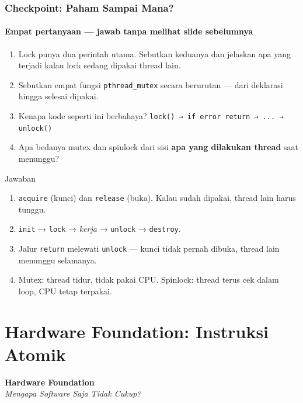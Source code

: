 \documentclass[t,aspectratio=169,xcolor=dvipsnames]{beamer}
\begin{document}
\begin{frame}
    \frametitle{Checkpoint: Paham Sampai Mana?}
    \framesubtitle{Empat pertanyaan — jawab tanpa melihat slide sebelumnya}
    \small

    \begin{enumerate}
        \item Lock punya dua perintah utama. Sebutkan keduanya dan jelaskan apa yang terjadi kalau lock sedang dipakai thread lain.
        \item Sebutkan empat fungsi \texttt{pthread\_mutex} secara berurutan — dari deklarasi hingga selesai dipakai.
        \item Kenapa kode seperti ini berbahaya?
        \texttt{lock() → if error return → ... → unlock()}
        \item Apa bedanya mutex dan spinlock dari sisi \textbf{apa yang dilakukan thread} saat menunggu?
    \end{enumerate}

    \begin{block}{Jawaban}
        \footnotesize
        \begin{enumerate}
            \item \texttt{acquire} (kunci) dan \texttt{release} (buka). Kalau sudah dipakai, thread lain harus tunggu.
            \item \texttt{init} → \texttt{lock} → \textit{kerja} → \texttt{unlock} → \texttt{destroy}.
            \item Jalur \texttt{return} melewati \texttt{unlock} — kunci tidak pernah dibuka, thread lain menunggu selamanya.
            \item Mutex: thread tidur, tidak pakai CPU. Spinlock: thread terus cek dalam loop, CPU tetap terpakai.
        \end{enumerate}
    \end{block}
\end{frame}

\section{Hardware Foundation: Instruksi Atomik}

\begin{frame}[plain]
    \begin{center}
        \vspace{3cm}
        \Huge\textbf{Hardware Foundation}\\[0.4em]
        \Large\textit{Mengapa Software Saja Tidak Cukup?}
    \end{center}
\end{frame}
\end{document}
